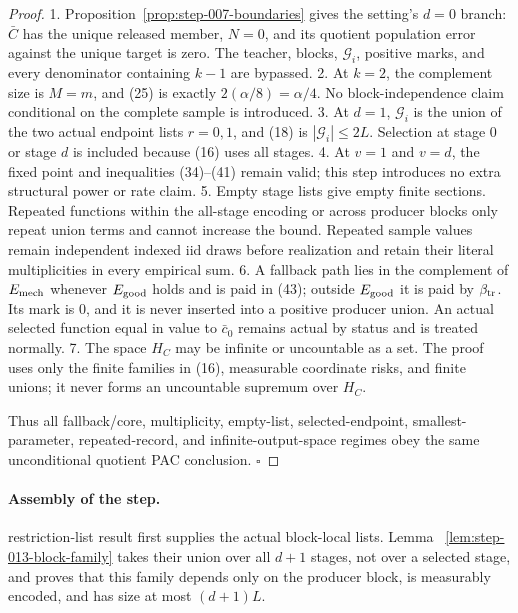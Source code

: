 \begin{proof}
1. Proposition~\ref{prop:step-007-boundaries} gives the setting's
   \(d=0\) branch: \(\bar C\) has the unique released member, \(N=0\), and
   its quotient population error against the unique target is zero. The
   teacher, blocks, \(\mathcal G_i\), positive marks, and every denominator
   containing \(k-1\) are bypassed.
2. At \(k=2\), the complement size is \(M=m\), and (25) is exactly
   \(2(\alpha/8)=\alpha/4\). No block-independence claim conditional on the
   complete sample is introduced.
3. At \(d=1\), \(\mathcal G_i\) is the union of the two actual endpoint
   lists \(r=0,1\), and (18) is \(|\mathcal G_i|\leq2L\). Selection at
   stage \(0\) or stage \(d\) is included because (16) uses all stages.
4. At \(v=1\) and \(v=d\), the  fixed point and inequalities
   (34)--(41) remain valid; this step introduces no extra structural power
   or rate claim.
5. Empty stage lists give empty finite sections. Repeated functions within
   the all-stage encoding or across producer blocks only repeat union terms
   and cannot increase the bound. Repeated sample values remain independent
   indexed iid draws before realization and retain their literal
   multiplicities in every empirical sum.
6. A fallback path lies in the complement of \(E_{\rm mech}\) whenever
   \(E_{\rm good}\) holds and is paid in (43); outside
   \(E_{\rm good}\) it is paid by \(\beta_{\rm tr}\). Its mark is \(0\),
   and it is never inserted into a positive producer union. An actual
   selected function equal in value to \(\bar c_0\) remains actual by
   status and is treated normally.
7. The space \(H_C\) may be infinite or uncountable as a set. The proof
   uses only the finite families in (16), measurable coordinate risks, and
   finite unions; it never forms an uncountable supremum over \(H_C\).

Thus all fallback/core, multiplicity, empty-list, selected-endpoint,
smallest-parameter, repeated-record, and infinite-output-space regimes obey
the same unconditional quotient PAC conclusion. \(\square\)


\end{proof}

\paragraph{Assembly of the step.}


restriction-list result first supplies the actual block-local lists. Lemma
~\ref{lem:step-013-block-family} takes their union over all \(d+1\) stages,
not over a selected stage, and proves that this family depends only on the
producer block, is measurably encoded, and has size at most \((d+1)L\).

